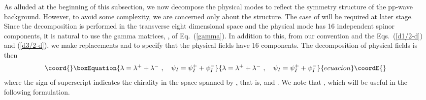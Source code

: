 \documentclass[a4paper,12pt]{article}
\numberwithin{equation}{section}
\begin{document}
As alluded at the beginning of this subsection, we now decompose the
physical modes to reflect the symmetry structure \coordHE{}
of the pp-wave background.  However, to avoid some complexity, we are
concerned only about the \coordHE{} structure.  The case of \coordHE{} will
be required at later stage.  Since the decomposition is performed in
the transverse eight dimensional space and the physical mode has 16
independent spinor components, it is natural to use the \coordHE{}
gamma matrices, \coordHE{}, of Eq.~(\ref{gamma}).  In addition to
this, from our convention and the Eqs.~(\ref{d1/2-d}) and
(\ref{d3/2-d}), we make replacements \coordHE{} and \coordHE{} to specify that the physical fields
have 16 components.  The decomposition of physical fields is then
\begin{equation}\coord{}\boxEquation{
\lambda = \lambda^+ + \lambda^- ~,~~~
\psi_I = \psi_I^+ + \psi_I^-
}{
\lambda = \lambda^+ + \lambda^- ~,~~~
\psi_I = \psi_I^+ + \psi_I^-
}{ecuacion}\coordE{}\end{equation}
where the sign of superscript indicates the \coordHE{} chirality in the
space spanned by \coordHE{}, that is, \coordHE{} and \coordHE{}.  We
note that \coordHE{}, which will be useful in
the following formulation.
\end{document}
